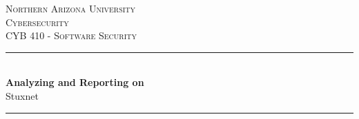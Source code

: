 \documentclass[12pt, letterpaper]{article}
\begin{document}
\newcommand{\paperauthor}{Akiel Aries}
\newcommand{\papersupervisor}{Prof. Sareh Assiri}
\newcommand{\paperuniversity}{Northern Arizona University}

\newcommand{\papertitle}{Analyzing and Reporting on}
\newcommand{\paperminortitle}{Stuxnet}
\newcommand{\papermajorheading}{Cybersecurity}
\newcommand{\paperminorheading}{CYB 410 - Software Security}

\newcommand{\HRule}{\rule{\linewidth}{0.5mm}} %

\center %


\textsc{\LARGE \paperuniversity}\\[1.0cm] %
\textsc{\Large \papermajorheading}\\[0.2cm] %
\textsc{\large \paperminorheading}\\[0.75cm] %


\HRule \\[0.4cm]
{ \huge \bfseries \papertitle}\\[0.05cm] %
{ \huge \paperminortitle}\\[0.025cm] %
\HRule \\[3.5cm]

\begin{center}
\end{center}
\end{document}
